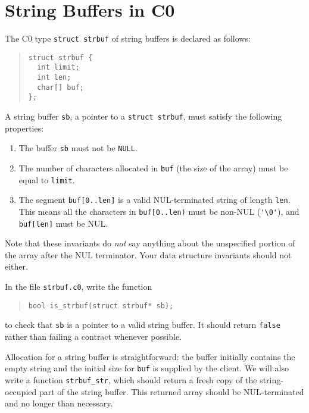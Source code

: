 \documentclass[12pt]{exam}
\begin{document}
\section{String Buffers in C0}

The C0 type \lstinline'struct strbuf' of string buffers is declared as
follows:

\begin{quote}
\begin{lstlisting}
struct strbuf {
  int limit;
  int len;
  char[] buf;
};
\end{lstlisting}
\end{quote}
A string buffer \lstinline'sb', a pointer to a %
\lstinline'struct strbuf', %
must satisfy the following properties:
\begin{enumerate}
\item%
  The buffer \lstinline'sb' must not be \lstinline'NULL'.
\item%
  The number of characters allocated in \lstinline'buf' (the size of
  the array) must be equal to \lstinline'limit'.
\item%
  The segment \lstinline'buf[0..len]' is a valid NUL-terminated string
  of length \lstinline'len'.  This means all the characters in
  \lstinline'buf[0..len)' must be non-NUL (\lstinline"'\0'"), and
  \lstinline'buf[len]' must be NUL.
\end{enumerate}
Note that these invariants do \emph{not} say anything about the
unspecified portion of the array after the NUL terminator. Your data
structure invariants should not either.

\begin{task}[4]
  In the file \lstinline'strbuf.c0', write the function
\begin{quote}
\begin{lstlisting}
bool is_strbuf(struct strbuf* sb);
\end{lstlisting}
\end{quote}
to check that \lstinline'sb' is a pointer to a valid string buffer. It
should return \lstinline'false' rather than failing a contract
whenever possible.
\end{task}

Allocation for a string buffer is straightforward: the buffer
initially contains the empty string and the initial size for
\lstinline'buf' is supplied by the client. We will also write a
function \lstinline'strbuf_str', which should return a fresh copy of
the string-occupied part of the string buffer. This returned array
should be NUL-terminated and no longer than necessary.
\end{document}
